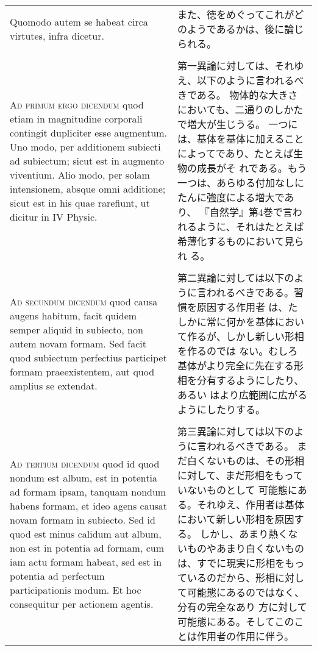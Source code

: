 \documentclass[10pt]{jsarticle} %
\begin{document}
\begin{longtable}{p{21em}p{21em}}
Quomodo autem se habeat circa virtutes, infra dicetur.

&

また、徳をめぐってこれがどのようであるかは、後に論じられる。

\\\\



{\scshape Ad primum ergo dicendum} quod etiam in magnitudine corporali contingit
dupliciter esse augmentum. Uno modo, per additionem subiecti ad
subiectum; sicut est in augmento viventium. Alio modo, per solam
intensionem, absque omni additione; sicut est in his quae rarefiunt,
ut dicitur in IV Physic.


&

第一異論に対しては、それゆえ、以下のように言われるべきである。
物体的な大きさにおいても、二通りのしかたで増大が生じうる。
一つには、基体を基体に加えることによってであり、たとえば生物の成長がそ
れである。もう一つは、あらゆる付加なしにたんに強度による増大であり、
『自然学』第4巻で言われるように、それはたとえば希薄化するものにおいて見られ
る。


\\\\



{\scshape Ad secundum dicendum} quod causa augens habitum, facit quidem semper
aliquid in subiecto, non autem novam formam. Sed facit quod subiectum
perfectius participet formam praeexistentem, aut quod amplius se
extendat.


&

第二異論に対しては以下のように言われるべきである。習慣を原因する作用者
は、たしかに常に何かを基体において作るが、しかし新しい形相を作るのでは
ない。むしろ基体がより完全に先在する形相を分有するようにしたり、あるい
はより広範囲に広がるようにしたりする。

\\\\



{\scshape Ad tertium dicendum} quod id quod nondum est album, est in potentia ad
formam ipsam, tanquam nondum habens formam, et ideo agens causat novam
formam in subiecto. Sed id quod est minus calidum aut album, non est
in potentia ad formam, cum iam actu formam habeat, sed est in potentia
ad perfectum participationis modum. Et hoc consequitur per actionem
agentis.


&

第三異論に対しては以下のように言われるべきである。
まだ白くないものは、その形相に対して、まだ形相をもっていないものとして
可能態にある。それゆえ、作用者は基体において新しい形相を原因する。
しかし、あまり熱くないものやあまり白くないものは、すでに現実に形相をもっ
 ているのだから、形相に対して可能態にあるのではなく、分有の完全なあり
 方に対して可能態にある。そしてこのことは作用者の作用に伴う。


\end{longtable}
\newpage
\end{document}

